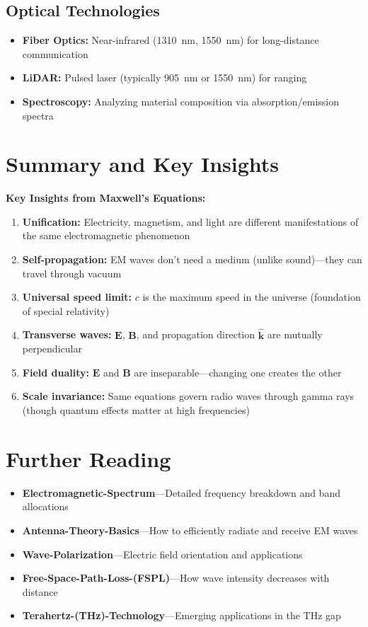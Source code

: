 \subsection{Optical Technologies}

\begin{itemize}
\item \textbf{Fiber Optics:} Near-infrared (1310~nm, 1550~nm) for long-distance communication
\item \textbf{LiDAR:} Pulsed laser (typically 905~nm or 1550~nm) for ranging
\item \textbf{Spectroscopy:} Analyzing material composition via absorption/emission spectra
\end{itemize}

\section{Summary and Key Insights}

\begin{keyconcept}
\textbf{Key Insights from Maxwell's Equations:}
\begin{enumerate}
\item \textbf{Unification:} Electricity, magnetism, and light are different manifestations of the same electromagnetic phenomenon
\item \textbf{Self-propagation:} EM waves don't need a medium (unlike sound)---they can travel through vacuum
\item \textbf{Universal speed limit:} $c$ is the maximum speed in the universe (foundation of special relativity)
\item \textbf{Transverse waves:} $\mathbf{E}$, $\mathbf{B}$, and propagation direction $\hat{\mathbf{k}}$ are mutually perpendicular
\item \textbf{Field duality:} $\mathbf{E}$ and $\mathbf{B}$ are inseparable---changing one creates the other
\item \textbf{Scale invariance:} Same equations govern radio waves through gamma rays (though quantum effects matter at high frequencies)
\end{enumerate}
\end{keyconcept}

\section{Further Reading}

\begin{itemize}
\item \textbf{Electromagnetic-Spectrum}---Detailed frequency breakdown and band allocations
\item \textbf{Antenna-Theory-Basics}---How to efficiently radiate and receive EM waves
\item \textbf{Wave-Polarization}---Electric field orientation and applications
\item \textbf{Free-Space-Path-Loss-(FSPL)}---How wave intensity decreases with distance
\item \textbf{Terahertz-(THz)-Technology}---Emerging applications in the THz gap
\end{itemize}


